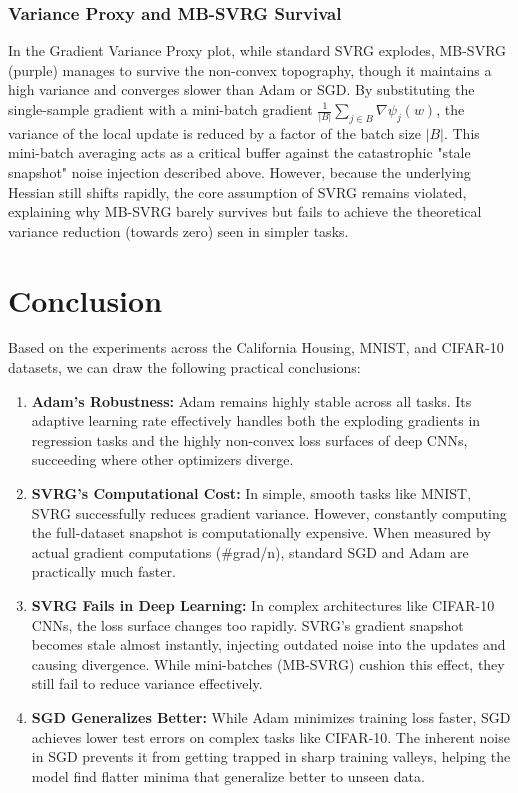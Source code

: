 \documentclass[11pt,a4paper]{article}
\begin{document}
\subsubsection{Variance Proxy and MB-SVRG Survival}
In the Gradient Variance Proxy plot, while standard SVRG explodes, MB-SVRG (purple) manages to survive the non-convex topography, though it maintains a high variance and converges slower than Adam or SGD. By substituting the single-sample gradient with a mini-batch gradient $\frac{1}{|B|} \sum_{j \in B} \nabla \psi_j(w)$, the variance of the local update is reduced by a factor of the batch size $|B|$. This mini-batch averaging acts as a critical buffer against the catastrophic "stale snapshot" noise injection described above. However, because the underlying Hessian still shifts rapidly, the core assumption of SVRG remains violated, explaining why MB-SVRG barely survives but fails to achieve the theoretical variance reduction (towards zero) seen in simpler tasks.

\newpage
\section{Conclusion}

Based on the experiments across the California Housing, MNIST, and CIFAR-10 datasets, we can draw the following practical conclusions:

\begin{enumerate}
    \item \textbf{Adam's Robustness:} Adam remains highly stable across all tasks. Its adaptive learning rate effectively handles both the exploding gradients in regression tasks and the highly non-convex loss surfaces of deep CNNs, succeeding where other optimizers diverge.
    
    \item \textbf{SVRG's Computational Cost:} In simple, smooth tasks like MNIST, SVRG successfully reduces gradient variance. However, constantly computing the full-dataset snapshot is computationally expensive. When measured by actual gradient computations (\#grad/n), standard SGD and Adam are practically much faster.
    
    \item \textbf{SVRG Fails in Deep Learning:} In complex architectures like CIFAR-10 CNNs, the loss surface changes too rapidly. SVRG's gradient snapshot becomes stale almost instantly, injecting outdated noise into the updates and causing divergence. While mini-batches (MB-SVRG) cushion this effect, they still fail to reduce variance effectively.
    
    \item \textbf{SGD Generalizes Better:} While Adam minimizes training loss faster, SGD achieves lower test errors on complex tasks like CIFAR-10. The inherent noise in SGD prevents it from getting trapped in sharp training valleys, helping the model find flatter minima that generalize better to unseen data.
\end{enumerate}
\end{document}
